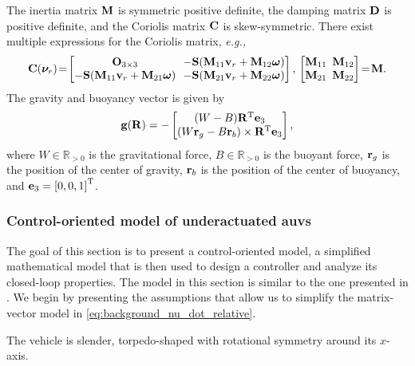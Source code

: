 The inertia matrix $\mathbf{M}$ is symmetric positive definite, the damping matrix $\mathbf{D}$ is positive definite, and the Coriolis matrix $\mathbf{C}$ is skew-symmetric.
There exist multiple expressions for the Coriolis matrix, \emph{e.g.,}
\begin{equation}
    \label{eq:background_coriolis}
    \mat{C}(\bs{\nu}_r)\! =\!
    \begin{bmatrix}
        \mat{O}_{3 \times 3} & \!\!-\mat{S}(\mat{M}_{11}\mat{v}_r + \mat{M}_{12}\bs{\omega}) \\
        -\mat{S}(\mat{M}_{11}\mat{v}_r + \mat{M}_{21}\bs{\omega}) & \!\!-\mat{S}(\mat{M}_{21}\mat{v}_r + \mat{M}_{22}\bs{\omega})
    \end{bmatrix}, \,
    \begin{bmatrix}
        \mat{M}_{11} & \!\!\!\mat{M}_{12} \\ \mat{M}_{21} & \!\!\!\mat{M}_{22}
    \end{bmatrix}\!
    = \!\mat{M}.
\end{equation}
The gravity and buoyancy vector is given by \cite{fossen_handbook_2011}
\begin{equation}
    \mathbf{g}(\mathbf{R}) = -
    \begin{bmatrix}
        (W - B) \mathbf{R}^{\mathrm{T}} \mathbf{e}_3 \\
        (W\mathbf{r}_g - B\mathbf{r}_b) \times \mathbf{R}^{\mathrm{T}} \mathbf{e}_3
    \end{bmatrix},
\end{equation}
where $W \in \mathbb{R}_{> 0}$ is the gravitational force, $B \in \mathbb{R}_{> 0}$ is the buoyant force, $\mathbf{r}_g$ is the position of the center of gravity, $\mathbf{r}_b$ is the position of the center of buoyancy, and $\mathbf{e}_3 = \left[0, 0, 1\right]^{\mathrm{T}}$.

\subsubsection*{Control-oriented model of underactuated \glspl{auv}}
The goal of this section is to present a control-oriented model, a simplified mathematical model that is then used to design a controller and analyze its closed-loop properties.
The model in this section is similar to the one presented in \cite{borhaug_straight_2007}.
We begin by presenting the assumptions that allow us to simplify the matrix-vector model in \eqref{eq:background_nu_dot_relative}.

\begin{asm}
    \label{asm:symmetric}
    The vehicle is slender, torpedo-shaped with rotational symmetry around its $x$-axis.
\end{asm}


